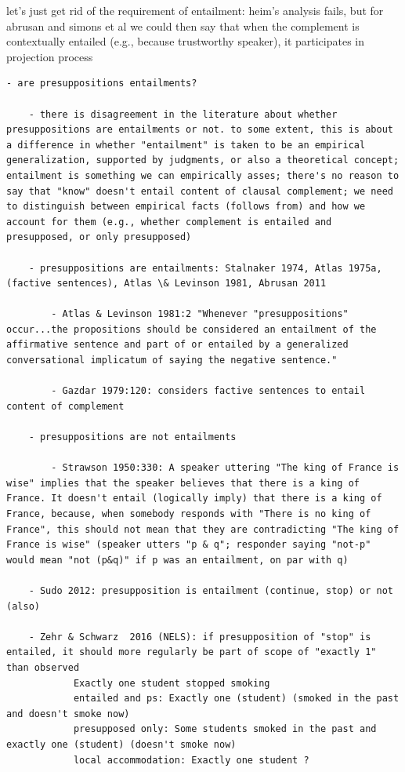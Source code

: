 \documentclass[11pt,fleqn]{article}
\newcommand{\6}{\mbox{$[\hspace*{-.6mm}[$}}
\newcommand{\9}{\mbox{$]\hspace*{-.6mm}]$}}
\begin{document}
{let's just get rid of the requirement of entailment: heim's analysis fails, but for abrusan and simons et al we could then say that when the complement is contextually entailed (e.g., because trustworthy speaker), it participates in projection process

\begin{verbatim}
- are presuppositions entailments?

	- there is disagreement in the literature about whether presuppositions are entailments or not. to some extent, this is about a difference in whether "entailment" is taken to be an empirical generalization, supported by judgments, or also a theoretical concept; entailment is something we can empirically asses; there's no reason to say that "know" doesn't entail content of clausal complement; we need to distinguish between empirical facts (follows from) and how we account for them (e.g., whether complement is entailed and presupposed, or only presupposed)
	
	- presuppositions are entailments: Stalnaker 1974, Atlas 1975a, (factive sentences), Atlas \& Levinson 1981, Abrusan 2011
	
		- Atlas & Levinson 1981:2 "Whenever "presuppositions" occur...the propositions should be considered an entailment of the affirmative sentence and part of or entailed by a generalized conversational implicatum of saying the negative sentence."
		
		- Gazdar 1979:120: considers factive sentences to entail content of complement
		
	- presuppositions are not entailments	
	
		- Strawson 1950:330: A speaker uttering "The king of France is wise" implies that the speaker believes that there is a king of France. It doesn't entail (logically imply) that there is a king of France, because, when somebody responds with "There is no king of France", this should not mean that they are contradicting "The king of France is wise" (speaker utters "p & q"; responder saying "not-p" would mean "not (p&q)" if p was an entailment, on par with q)
		
	- Sudo 2012: presupposition is entailment (continue, stop) or not (also)
	
	- Zehr & Schwarz  2016 (NELS): if presupposition of "stop" is entailed, it should more regularly be part of scope of "exactly 1" than observed
			Exactly one student stopped smoking
			entailed and ps: Exactly one (student) (smoked in the past and doesn't smoke now) 
			presupposed only: Some students smoked in the past and exactly one (student) (doesn't smoke now)
			local accommodation: Exactly one student ?
			

\end{verbatim}}
\end{document}
